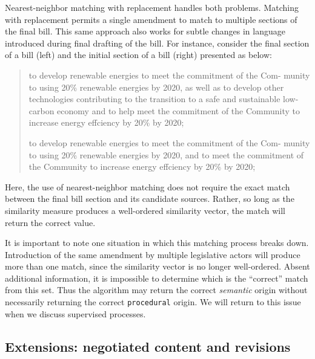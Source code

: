 \documentclass[11pt]{article}
\begin{document}
Nearest-neighbor matching with replacement handles both
problems. Matching with replacement permits a single amendment to
match to multiple sections of the final bill. This same approach also works for subtle changes in language
introduced during final drafting of the bill. For instance, consider
the final section of a bill (left) and the initial section of a bill
(right) presented as below:
\begin{quote}
  \begin{minipage}[t]{0.45\linewidth}
    to develop renewable energies to meet the commitment of the Com-
    munity to using 20\% renewable energies by 2020, as well as to
    develop other technologies contributing to the transition to a
    safe and sustainable low-carbon economy and to help meet the commitment of the Community to increase energy effciency by 20\% by
    2020;
  \end{minipage}
  \begin{minipage}[h]{0.08\linewidth}
  \end{minipage}
  \begin{minipage}[t]{0.45\linewidth}
    to develop renewable energies to meet the commitment of the Com-
    munity to using 20\% renewable energies by 2020, and to meet the
    commitment of the Community to increase energy effciency by 20\%
    by 2020;
  \end{minipage}
\end{quote}

Here, the use of nearest-neighbor matching does not require the exact
match between the final bill section and its candidate
sources. Rather, so long as the similarity measure produces a
well-ordered similarity vector, the match will return the correct value.

It is important to note one situation in which this matching process
breaks down. Introduction of the same amendment by multiple
legislative actors will produce more than one match, since the
similarity vector is no longer well-ordered. Absent additional
information, it is impossible to determine which is the ``correct''
match from this set. Thus the algorithm may return the correct
\textit{semantic} origin without necessarily returning the correct
\texttt{procedural} origin. We will return to this issue when we discuss
supervised processes.

\subsection{Extensions: negotiated content and revisions}
\label{sec:extens-negot-cont}
\end{document}
